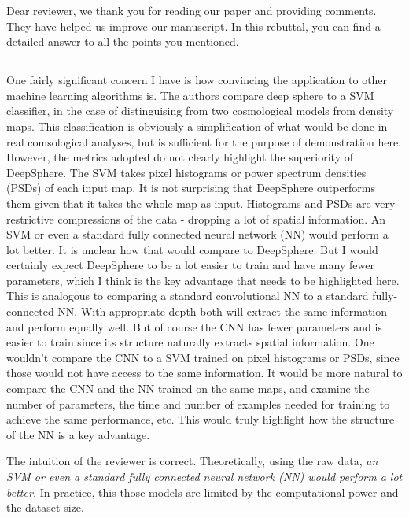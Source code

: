 \documentclass[12pt,a4paper]{article}
\newcommand{\todo}[1]{{\color[rgb]{.6,.1,.6}{TODO: #1}}}
\newcommand{\1}{\b{1}}              %
\newcommand{\0}{\b{0}}              %
\begin{document}
Dear reviewer, we thank you for reading our paper and providing comments. They have helped us improve our manuscript. In this rebuttal, you can find a detailed answer to all the points you mentioned. 

\subsection{}
\begin{mdframed}[style=comment] 
One fairly significant concern I have is how convincing the application to other machine learning algorithms is. The authors compare deep sphere to a SVM classifier, in the case of distinguising from two cosmological models from density maps. This classification is obviously a simplification of what would be done in real comsological analyses, but is sufficient for the purpose of demonstration here. However, the metrics adopted do not clearly highlight the superiority of DeepSphere. The SVM takes pixel histograms or power spectrum densities (PSDs) of each input map. It is not surprising that DeepSphere outperforms them given that it takes the whole map as input. Histograms and PSDs are very restrictive compressions of the data - dropping a lot of spatial information. An SVM or even a standard fully connected neural network (NN) would perform a lot better. It is unclear how that would compare to DeepSphere. But I would certainly expect DeepSphere to be a lot easier to train and have many fewer parameters, which I think is the key advantage that needs to be highlighted here. This is analogous to comparing a standard convolutional NN to a standard fully-connected NN. With appropriate depth both will extract the same information and perform equally well. But of course the CNN has fewer parameters and is easier to train since its structure naturally extracts spatial information. One wouldn't compare the CNN to a SVM trained on pixel histograms or PSDs, since those would not have access to the same information. It would be more natural to compare the CNN and the NN trained on the same maps, and examine the number of parameters, the time and number of examples needed for training to achieve the same performance, etc. This would truly highlight how the structure of the NN is a key advantage.
\end{mdframed}

\todo{Assigned: @nati, @michael}
The intuition of the reviewer is correct. Theoretically, using the raw data, \emph{an SVM or even a standard fully connected neural network (NN) would perform a lot better.} In practice, this those models are limited by the computational power and the dataset size. 
\end{document}
